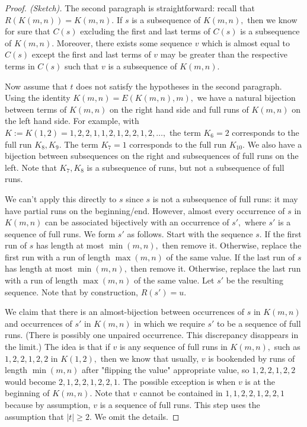 \documentclass[11pt]{amsart} %
\begin{document}
\begin{proof}[Proof. (Sketch)] The second paragraph is straightforward: recall that $R(K(m,n)) = K(m,n).$ If $s$ is a subsequence of $K(m,n),$ then we know for sure that $C(s)$ excluding the first and last terms of $C(s)$ is a subsequence of $K(m,n).$ Moreover, there exists some sequence $v$ which is almost equal to $C(s)$ except the first and last terms of $v$ may be greater than the respective terms in $C(s)$ such that $v$ is a subsequence of $K(m,n).$ 

Now assume that $t$ does not satisfy the hypotheses in the second paragraph. Using the identity $K(m,n) = E(K(m,n), m),$ we have a natural bijection between terms of $K(m,n)$ on the right hand side and full runs of $K(m,n)$ on the left hand side. For example, with $K:= K(1,2) = 1,2,2,1,1,2,1,2,2,1,2, \ldots,$ the term $K_6 = 2$ corresponds to the full run $K_8,K_9.$ The term $K_7=1$ corresponds to the full run $K_{10}.$ We also have a bijection between subsequences on the right and subsequences of full runs on the left. Note that $K_7,K_8$ is a subsequence of runs, but not a subsequence of full runs. 

We can't apply this directly to $s$ since $s$ is not a subsequence of full runs: it may have partial runs on the beginning/end. However, almost every occurrence of $s$ in $K(m,n)$ can be associated bijectively with an occurrence of $s',$ where $s'$ is a sequence of full runs. We form $s'$ as follows. Start with the sequence $s.$ If the first run of $s$ has length at most $\min(m,n),$ then remove it. Otherwise, replace the first run with a run of length $\max(m,n)$ of the same value. If the last run of $s$ has length at most $\min(m,n),$ then remove it. Otherwise, replace the last run with a run of length $\max(m,n)$ of the same value. Let $s'$ be the resulting sequence. Note that by construction, $R(s') = u.$

We claim that there is an almost-bijection between occurrences of $s$ in $K(m,n)$ and occurrences of $s'$ in $K(m,n)$ in which we require $s'$ to be a sequence of full runs. (There is possibly one unpaired occurrence. This discrepancy disappears in the limit.) The idea is that if $v$ is any sequence of full runs in $K(m,n),$ such as $1,2,2,1,2,2$ in $K(1,2),$ then we know that usually, $v$ is bookended by runs of length $\min(m,n)$ after "flipping the value" appropriate value, so $1,2,2,1,2,2$ would become $2,1,2,2,1,2,2,1.$ The possible exception is when $v$ is at the beginning of $K(m,n).$ Note that $v$ cannot be contained in $1,1,2,2,1,2,2,1$ because by assumption, $v$ is a sequence of full runs. This step uses the assumption that $|t| \ge 2.$ We omit the details.


\end{proof}
\end{document}
